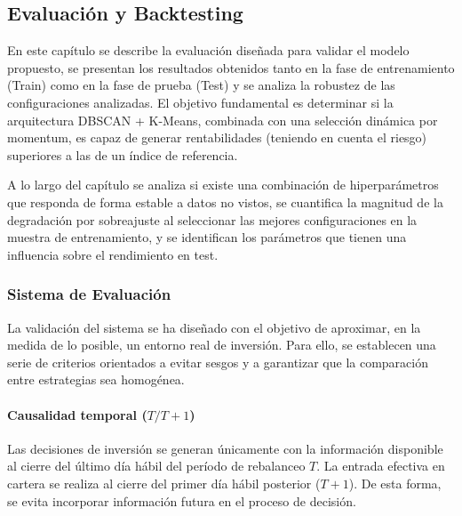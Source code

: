 
\subsection{Evaluación y Backtesting}

En este capítulo se describe la evaluación
diseñada para validar el modelo propuesto, se presentan
los resultados obtenidos tanto en la fase de
entrenamiento (Train) como en la fase de prueba
(Test) y se analiza la robustez de las
configuraciones analizadas. El objetivo fundamental es
determinar si la arquitectura DBSCAN + K-Means,
combinada con una selección dinámica por momentum, es capaz de
generar rentabilidades (teniendo en cuenta el riesgo) superiores a las de
un índice de referencia.

A lo largo del capítulo se analiza si existe una combinación de hiperparámetros que responda de forma estable a datos no vistos, se cuantifica la magnitud de la degradación por sobreajuste al seleccionar las mejores configuraciones en la muestra de entrenamiento, y se identifican los parámetros que tienen una influencia sobre el rendimiento en test.


\subsubsection{Sistema de Evaluación}

La validación del sistema se ha diseñado con el objetivo de
aproximar, en la medida de lo posible, un entorno real de
inversión. Para ello, se establecen una serie de criterios orientados a evitar sesgos y a garantizar que la
comparación entre estrategias sea homogénea.

\paragraph{Causalidad temporal ($T/T+1$)}

Las decisiones de inversión se generan únicamente con la
información disponible al cierre del último día hábil del período
de rebalanceo $T$. La entrada efectiva en cartera se realiza al
cierre del primer día hábil posterior ($T+1$). De esta forma,
se evita incorporar información futura en el proceso de decisión.

